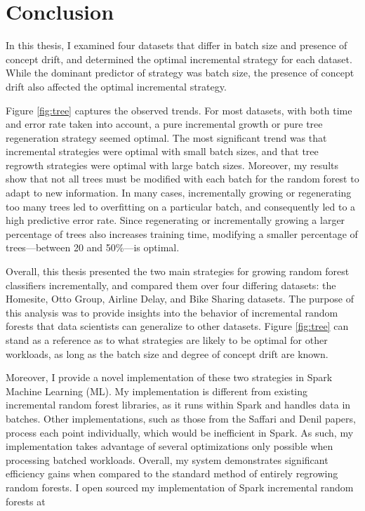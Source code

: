 \chapter{Conclusion}

In this thesis, I examined four datasets that differ in batch size and
presence of concept drift, and determined the optimal incremental strategy for
each dataset. While the dominant predictor of strategy was batch size, the
presence of concept drift also affected the optimal incremental strategy.

Figure \ref{fig:tree} captures the observed trends. For most datasets, with
both time and error rate taken into account, a pure incremental growth or pure
tree regeneration strategy seemed optimal. The most significant trend was that
incremental strategies were optimal with small batch sizes, and that tree
regrowth strategies were optimal with large batch sizes. Moreover, my results
show that not all trees must be modified with each batch for the random forest
to adapt to new information. In many cases, incrementally growing or
regenerating too many trees led to overfitting on a particular batch, and
consequently led to a high predictive error rate. Since regenerating or
incrementally growing a larger percentage of trees also increases training
time, modifying a smaller percentage of trees---between 20 and 50\%---is
optimal.

Overall, this thesis presented the two main strategies for growing random
forest classifiers incrementally, and compared them over four differing
datasets: the Homesite, Otto Group, Airline Delay, and Bike Sharing datasets.
The purpose of this analysis was to provide insights into the behavior of
incremental random forests that data scientists can generalize to other
datasets. Figure \ref{fig:tree} can stand as a reference as to what strategies
are likely to be optimal for other workloads, as long as the batch size and
degree of concept drift are known.

Moreover, I provide a novel implementation of these two strategies in Spark
Machine Learning (ML). My implementation is different from existing incremental
random forest libraries, as it runs within Spark and handles data in batches.
Other implementations, such as those from the Saffari and Denil papers, process
each point individually, which would be inefficient in Spark. As such, my
implementation takes advantage of several optimizations only possible when
processing batched workloads. Overall, my system demonstrates significant
efficiency gains when compared to the standard method of entirely regrowing
random forests. I open sourced my implementation of Spark incremental random
forests at 

